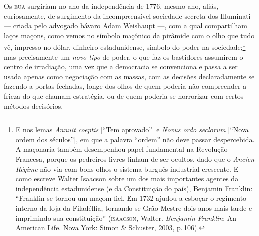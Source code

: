 Os \textsc{eua} surgiriam no ano da independência de 1776, mesmo ano, aliás,
curiosamente, de surgimento da incompreensível sociedade secreta dos
Illuminati --- criada pelo advogado bávaro Adam Weishaupt ---, com 
a qual compartilham laços maçons, como vemos no símbolo maçônico da pirâmide 
com o olho que tudo vê, impresso no dólar, dinheiro estadunidense, símbolo do 
poder na
sociedade;\footnote{E nos
  lemas \emph{Annuit coeptis} [``Tem aprovado''] e \emph{Novus ordo
  seclorum} [``Nova ordem dos séculos''], em que a palavra ``ordem'' não
  deve passar despercebida. A maçonaria também desempenhou papel
  fundamental na Revolução Francesa, porque os pedreiros-livres tinham
  de ser ocultos, dado que o \emph{Ancien Régime} não via com bons olhos
  o sistema burguês-industrial crescente. E como escreve Walter Isaacson
  sobre um dos mais importantes agentes da independência estadunidense
  (e da Constituição do país), Benjamin Franklin: ``Franklin se tornou
  um maçom fiel. Em 1732 ajudou a esboçar o regimento interno da loja da
  Filadélfia, tornando-se Grão-Mestre dois anos mais tarde e imprimindo
  sua constituição'' (\textsc{isaacson}, Walter. \emph{Benjamin
  Franklin}: An American Life. Nova York: Simon \& Schuster, 2003, p.\,106).}
 mas precisamente um \emph{novo tipo} de poder, o que faz os
bastidores assumirem o centro de irradiação, uma vez que a democracia se
convenciona e passa a ser usada apenas como negociação com as massas,
com as decisões declaradamente se fazendo a portas fechadas, longe dos
olhos de quem poderia não compreender a frieza do que chamam estratégia,
ou de quem poderia se horrorizar com certos métodos decisórios.


